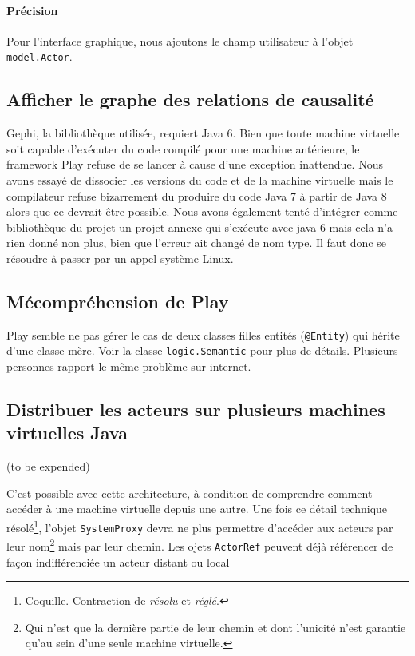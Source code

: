 \documentclass[11pt]{article}
\begin{document}
\paragraph{Précision} Pour l'interface graphique, nous ajoutons le champ utilisateur à l'objet \texttt{model.Actor}.

\subsection{Afficher le graphe des relations de causalité} Gephi, la bibliothèque utilisée, requiert Java 6. Bien que toute machine virtuelle soit capable d'exécuter du code compilé pour une machine antérieure, le framework Play refuse de se lancer à cause d'une exception inattendue.
Nous avons essayé de dissocier les versions du code et de la machine virtuelle mais le compilateur refuse bizarrement du produire du code Java 7 à partir de Java 8 alors que ce devrait être possible. Nous avons également tenté d'intégrer comme bibliothèque du projet un projet annexe qui s'exécute avec java 6 mais cela n'a rien donné non plus, bien que l'erreur ait changé de nom type. Il faut donc se résoudre à passer par un appel système Linux.

\subsection{Mécompréhension de Play} Play semble ne pas gérer le cas de deux classes filles entités (\texttt{@Entity}) qui hérite d'une classe mère. Voir la classe \texttt{logic.Semantic} pour plus de détails. Plusieurs personnes rapport le même problème sur internet.

\subsection{Distribuer les acteurs sur plusieurs machines virtuelles Java}

(to be expended)

C'est possible avec cette architecture, à condition de comprendre comment accéder à une machine virtuelle depuis une autre. Une fois ce détail technique résolé\footnote{Coquille. Contraction de \textsl{résolu} et \textsl{réglé}.}, l'objet \texttt{SystemProxy} devra ne plus permettre d'accéder aux acteurs par leur nom\footnote{Qui n'est que la dernière partie de leur chemin et dont l'unicité n'est garantie qu'au sein d'une seule machine virtuelle.} mais par leur chemin. Les ojets \texttt{ActorRef} peuvent déjà référencer de façon indifférenciée un acteur distant ou local
\end{document}
